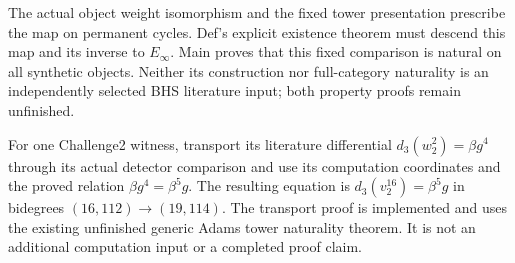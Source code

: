 \begin{theorem}
  \label{thm:main-weight-shift-naturality}
  \notready
  The actual object weight isomorphism and the fixed tower presentation
  prescribe the map on permanent cycles. Def's explicit existence theorem
  must descend this map and its inverse to $E_\infty$. Main proves that
  this fixed comparison is natural on all synthetic objects. Neither its
  construction nor full-category naturality is an independently selected
  BHS literature input; both property proofs remain unfinished.
\end{theorem}

\begin{theorem}
  \label{thm:main-tmf-br21-coordinate-differential}
  \notready
  For one Challenge2 witness, transport its literature differential
  $d_3(w_2^2)=\beta g^4$ through its actual detector comparison and use
  its computation coordinates and the proved relation
  $\beta g^4=\beta^5g$. The resulting equation is
  $d_3(v_2^{16})=\beta^5g$ in bidegrees
  $(16,112)\to(19,114)$. The transport proof is implemented and uses the
  existing unfinished generic Adams tower naturality theorem. It is not
  an additional computation input or a completed proof claim.
\end{theorem}
